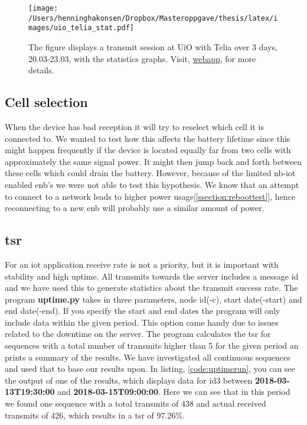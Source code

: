 \documentclass[USenglish]{ifimaster}  %
\begin{document}
\begin{figure}[H]
  \centering
  \texttt{[image: /Users/henninghakonsen/Dropbox/Masteroppgave/thesis/latex/images/uio\_telia\_stat.pdf]}
  \caption[Long-term test - Telia 20.03-23.03, statistics]{The figure displays a transmit session at UiO with Telia over 3 days, 20.03-23.03, with the statistics graphs. Visit, \href{http://158.39.77.97:9000/\#/nodes/id1}{webapp}, for more details.}
  \label{figure:uio_telia_stat}
\end{figure}

\subsection{Cell selection}
When the device has bad reception it will try to reselect which cell it is connected to. We wanted to test how this affects the battery lifetime since this might happen frequently if the device is located equally far from two cells with approximately the same signal power. It might then jump back and forth between these cells which could drain the battery. However, because of the limited \acrshort{nb-iot} enabled \acrshort{enb}'s we were not able to test this hypothesis. We know that an attempt to connect to a network leads to higher power usage[\ref{ssection:reboottest}], hence reconnecting to a new \acrshort{enb} will probably use a similar amount of power.

\subsection[\acrlong{tsr}]{\acrfull{tsr}}
For an \acrshort{iot} application receive rate is not a priority, but it is important with stability and high uptime. All transmits towards the server includes a message id and we have used this to generate statistics about the transmit success rate. The program \textbf{uptime.py} takes in three parameters, node id(-c), start date(-start) and end date(-end). If you specify the start and end dates the program will only include data within the given period. This option came handy due to issues related to the downtime on the server.
The program calculates the \acrshort{tsr} for sequences with a total number of transmits higher than 5 for the given period an prints a summary of the results. We have investigated all continuous sequences and used that to base our results upon. In listing, \vref{code:uptimerun}, you can see the output of one of the results, which displays data for id3 between \textbf{2018-03-13T19:30:00} and \textbf{2018-03-15T09:00:00}. Here we can see that in this period we found one sequence with a total transmits of 438 and actual received transmits of 426, which results in a \acrshort{tsr} of 97.26\%.
\end{document}
